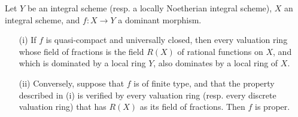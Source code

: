 \begin{corollary}
\label{II.7.3.10}
Let $Y$ be an integral scheme (resp. a locally Noetherian integral scheme), $X$ an integral scheme, and $f:X\to Y$ a dominant morphism.
\begin{enumerate}
    \item[\rm{(i)}] If $f$ is quasi-compact and universally closed, then every valuation ring whose field of fractions is the field $R(X)$ of rational functions on $X$, and which is dominated by a local ring $Y$, also dominates by a local ring of $X$.
    \item[\rm{(ii)}] Conversely, suppose that $f$ is of finite type, and that the property described in (i) is verified by every valuation ring (resp. every discrete valuation ring) that has $R(X)$ as its field of fractions.
        Then $f$ is proper.
\end{enumerate}
\end{corollary}

